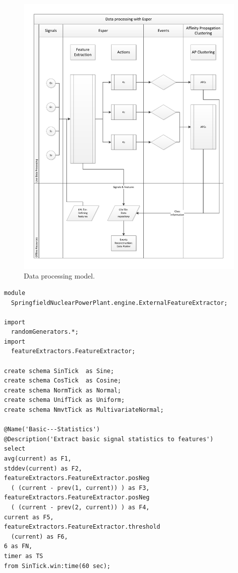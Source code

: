 \documentclass[11pt, letterpaper]{article}            %
\begin{document}
\begin{figure}[htbp]
	\centering
	\includegraphics[width=\textwidth]{./gfx/model.pdf}
  \caption{Data processing model.\label{fig:model}}
\end{figure}

\begin{lstlisting}
module
  SpringfieldNuclearPowerPlant.engine.ExternalFeatureExtractor;

import
  randomGenerators.*;
import
  featureExtractors.FeatureExtractor;

create schema SinTick  as Sine;
create schema CosTick  as Cosine;
create schema NormTick as Normal;
create schema UnifTick as Uniform;
create schema NmvtTick as MultivariateNormal;

@Name('Basic---Statistics')
@Description('Extract basic signal statistics to features')
select
avg(current) as F1,
stddev(current) as F2,
featureExtractors.FeatureExtractor.posNeg
  ( (current - prev(1, current)) ) as F3,
featureExtractors.FeatureExtractor.posNeg
  ( (current - prev(2, current)) ) as F4,
current as F5,
featureExtractors.FeatureExtractor.threshold
  (current) as F6,
6 as FN,
timer as TS
from SinTick.win:time(60 sec);
\end{lstlisting}
\end{document}
